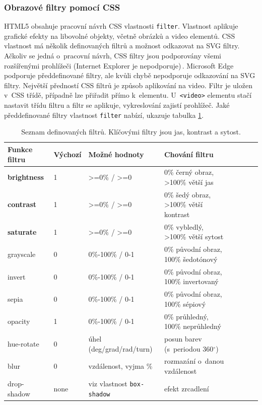 \subsubsection{Obrazové filtry pomocí CSS}
HTML5 obsahuje pracovní návrh CSS vlastnosti \texttt{filter}. Vlastnost aplikuje grafické efekty na libovolné objekty, včetně obrázků a video elementů. CSS vlastnost má několik definovaných filtrů a možnost odkazovat na SVG filtry. Ačkoliv se jedná o~pracovní návrh, CSS filtry jsou podporovány všemi rozšířenými prohlížeči (Internet Explorer je nepodporuje)\,\cite{MDNfilter}. Microsoft Edge podporuje předdefinované filtry, ale kvůli chybě nepodporuje odkazování na SVG filtry. Největší předností CSS filtrů je způsob aplikování na video. Filtr je uložen v~CSS třídě, případně lze přiřadit přímo k~elementu. U~\texttt{<video>} elementu stačí nastavit třídu filtru a filtr se aplikuje, vykreslování zajistí prohlížeč. Jaké předdefinované filtry vlastnost \texttt{filter} nabízí, ukazuje tabulka \ref{tab:filters}.
\begin{table}[h]
    \centering
    \begin{tabular}{|l|l|l|l|l|l|l|l|}
    \hline
    Funkce filtru   & Výchozí & Možné hodnoty & Chování filtru \\
    \hline
    \textbf{brightness}  & 1 & >=0\% / >=0 & 0\% černý obraz, >100\% větší jas \\
    \textbf{contrast}    & 1 & >=0\% / >=0 & 0\% šedý obraz, >100\% větší kontrast\\
    \textbf{saturate}    & 1 & >=0\% / >=0 & 0\% vybledlý, >100\% větší sytost\\
    grayscale   & 0 & 0\%-100\% / 0-1 & 0\% původní obraz, 100\% šedotónový\\
    invert      & 0 & 0\%-100\% / 0-1 & 0\% původní obraz, 100\% invertovaný\\
    sepia       & 0 & 0\%-100\% / 0-1 & 0\% původní obraz, 100\% sépiový\\
    opacity     & 1 & 0\%-100\% / 0-1 & 0\% průhledný, 100\% neprůhledný\\
    hue-rotate  & 0 & úhel (deg/grad/rad/turn) & posun barev (s~periodou 360$^{\circ}$)\\
    blur        & 0 & vzdálenost, vyjma \% & rozmazání o~danou vzdálenost \\
    drop-shadow & none & viz vlastnost \texttt{box-shadow} & efekt zrcadlení\\
    \hline
    \end{tabular}
    \caption{Seznam definovaných filtrů. Klíčovými filtry jsou jas, kontrast a sytost.}
    \label{tab:filters}
\end{table}

